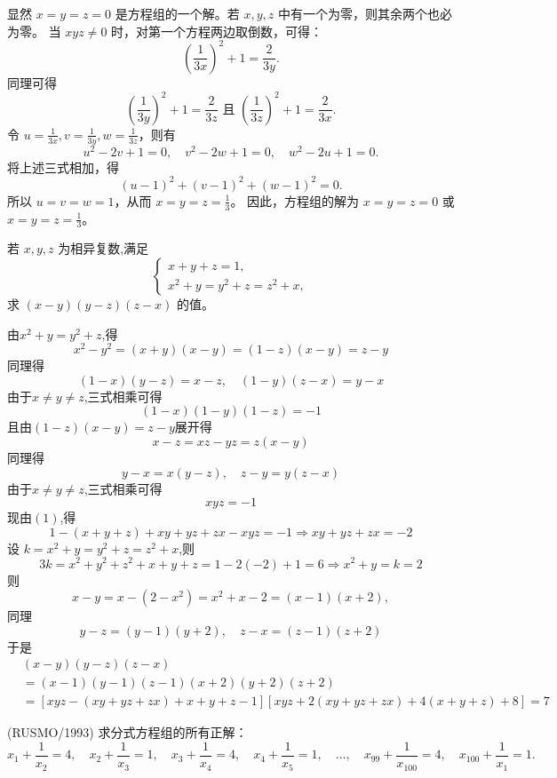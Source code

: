 \begin{questions}
\begin{solution}
显然 $x = y = z = 0$ 是方程组的一个解。若 $x, y, z$ 中有一个为零，则其余两个也必为零。
当 $xyz \neq 0$ 时，对第一个方程两边取倒数，可得：
\[
\left( \frac{1}{3x} \right)^2 + 1 = \frac{2}{3y}.
\]
同理可得
\[
\left( \frac{1}{3y} \right)^2 + 1 = \frac{2}{3z} \text{ 且 } \left( \frac{1}{3z} \right)^2 + 1 = \frac{2}{3x}.
\]
令 $u = \frac{1}{3x}, v = \frac{1}{3y}, w = \frac{1}{3z}$，则有
\[
u^2 - 2v + 1 = 0, \quad v^2 - 2w + 1 = 0, \quad w^2 - 2u + 1 = 0.
\]
将上述三式相加，得
\[
(u - 1)^2 + (v - 1)^2 + (w - 1)^2 = 0.
\]
所以 $u = v = w = 1$，从而 $x = y = z = \frac{1}{3}$。
因此，方程组的解为 $x = y = z = 0$ 或 $x = y = z = \frac{1}{3}$。
\end{solution}

    \question 若 $x,y,z$ 为相异复数,满足
    \[
    \begin{cases}
    x+y+z=1,\\
    x^2+y=y^2+z=z^2+x,
    \end{cases}
    \]
    求 $(x-y)(y-z)(z-x)$ 的值。
    \begin{solution}
        由$x^2+y=y^2+z$,得
        \[
        x^2-y^2=(x+y)(x-y)=(1-z)(x-y)=z-y
        \]
        同理得
        \[
        (1-x)(y-z)=x-z,\quad (1-y)(z-x)=y-x
        \]
        由于$x \neq y \neq z$,三式相乘可得
        \[
        (1-x)(1-y)(1-z)=-1 \tag{1}
        \]
        且由$(1-z)(x-y)=z-y$展开得
        \[
        x-z=xz-yz=z(x-y)
        \]
        同理得
        \[
        y-x=x(y-z),\quad z-y=y(z-x)
        \]
        由于$x \neq y \neq z$,三式相乘可得
        \[
        xyz=-1
        \]
        现由$(1)$,得
        \[
        1-(x+y+z)+xy+yz+zx-xyz=-1 \Rightarrow xy+yz+zx=-2
        \]
        设 $k = x^2+y = y^2+z = z^2+x$,则
        \[
        3k=x^2+y^2+z^2+x+y+z=1-2(-2)+1=6 \Rightarrow x^2+y=k=2
        \]
        则
        \[
        x-y=x-(2-x^2)=x^2+x-2=(x-1)(x+2),
        \]
        同理
        \[
        y-z=(y-1)(y+2),\quad z-x=(z-1)(z+2)
        \]
        于是
        \begin{align*}
        &(x-y)(y-z)(z-x) \\
        &= (x-1)(y-1)(z-1)(x+2)(y+2)(z+2) \\
        &= [xyz-(xy+yz+zx)+x+y+z-1][xyz+2(xy+yz+zx)+4(x+y+z)+8]=7
        \end{align*}
    \end{solution}

    \question (RUSMO/1993) 求分式方程组的所有正解：
\[
x_1 + \frac{1}{x_2} = 4, \quad x_2 + \frac{1}{x_3} = 1, \quad x_3 + \frac{1}{x_4} = 4, \quad x_4 + \frac{1}{x_5} = 1, \quad \dots, \quad x_{99} + \frac{1}{x_{100}} = 4, \quad x_{100} + \frac{1}{x_1} = 1.
\]


\end{questions}
